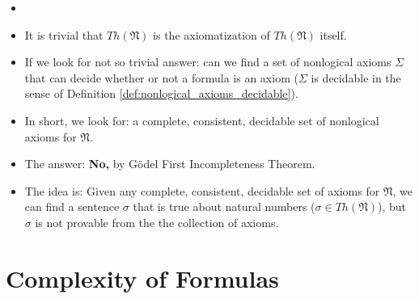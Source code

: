 \documentclass[11pt,letterpaper]{book}
\theoremstyle{definition}
\begin{document}
\begin{itemize}
\item[]
\item{It is trivial that $Th(\mathfrak{N})$ is the axiomatization of
$Th(\mathfrak{N})$ itself.}
\item{If we look for not so trivial answer: can we
find a set of nonlogical axioms $\Sigma$ that can decide whether or not
a formula is an axiom ($\Sigma$ is decidable in the sense of Definition \ref{def:nonlogical_axioms_decidable}). }
\item{In short, we look for: a complete, consistent, decidable set of
nonlogical axioms for $\mathfrak{N}$.}
\item{The answer: \textbf{No,} by G\" odel First Incompleteness
Theorem.}
\item{The idea is: Given any complete, consistent, decidable set of
axioms for $\mathfrak{N}$, we can find a sentence $\sigma$ that is true
about natural numbers ($\sigma \in Th(\mathfrak{N})$), but $\sigma$ is
not provable from the the collection of axioms.}
\end{itemize}




\section{Complexity of Formulas}
\end{document}
